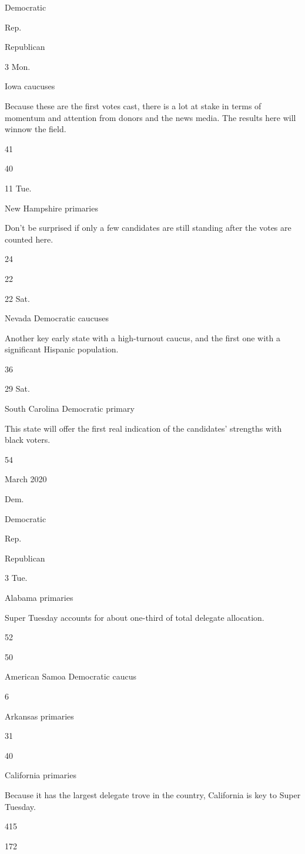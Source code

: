 Democratic

Rep.

Republican

3 Mon.

Iowa caucuses

Because these are the first votes cast, there is a lot at stake in terms
of momentum and attention from donors and the news media. The results
here will winnow the field.

41

40

11 Tue.

New Hampshire primaries

Don't be surprised if only a few candidates are still standing after the
votes are counted here.

24

22

22 Sat.

Nevada Democratic caucuses

Another key early state with a high-turnout caucus, and the first one
with a significant Hispanic population.

36

29 Sat.

South Carolina Democratic primary

This state will offer the first real indication of the candidates'
strengths with black voters.

54

March 2020

Dem.

Democratic

Rep.

Republican

3 Tue.

Alabama primaries

Super Tuesday accounts for about one-third of total delegate allocation.

52

50

American Samoa Democratic caucus

6

Arkansas primaries

31

40

California primaries

Because it has the largest delegate trove in the country, California is
key to Super Tuesday.

415

172

